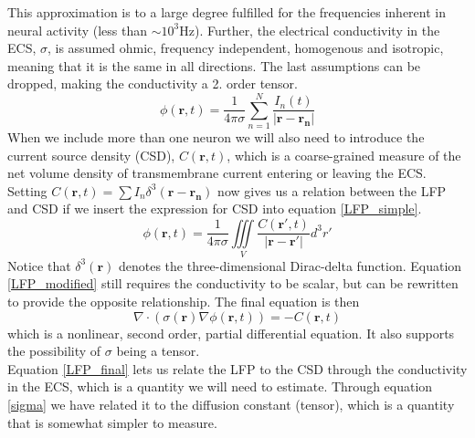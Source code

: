 \documentclass[a4paper,english, 12pt, twoside]{article}
\begin{document}
This approximation is to a large degree fulfilled for the frequencies inherent in neural activity (less than $\sim 10^3$Hz). 
Further, the electrical conductivity in the ECS, $\sigma$, is assumed ohmic, frequency independent, homogenous and isotropic, meaning that it is the same in all directions. 
The last assumptions can be dropped, making the conductivity a 2. order tensor.
\begin{equation}\label{LFP_simple}
 \phi(\mathbf{r},t) = \frac{1}{4\pi\sigma}\sum\limits_{n=1}^N\frac{I_n(t)}{|\mathbf{r}-\mathbf{r_n}|}
\end{equation}
When we include more than one neuron we will also need to introduce the current source density (CSD), $C(\mathbf{r},t)$, which is a coarse-grained measure of the net volume density of transmembrane current entering or leaving the ECS. 
Setting $C(\mathbf{r},t) = \sum I_n\delta^3(\mathbf{r}-\mathbf{r_n})$ now gives us a relation between the LFP and CSD if we insert the expression for CSD into equation \ref{LFP_simple}.
\begin{equation}\label{LFP_modified}
  \phi(\mathbf{r},t) = \frac{1}{4\pi\sigma}\iiint\limits_{V}\frac{C(\mathbf{r'},t)}{|\mathbf{r}-\mathbf{r'}|}d^3r'
\end{equation}
Notice that $\delta^3(\mathbf{r})$ denotes the three-dimensional Dirac-delta function. 
Equation \ref{LFP_modified} still requires the conductivity to be scalar, but can be rewritten to provide the opposite relationship. 
The final equation is then 
\begin{equation}\label{LFP_final}
 \nabla\cdot(\sigma(\mathbf{r})\nabla\phi(\mathbf{r},t)) = -C(\mathbf{r},t)
\end{equation}
which is a nonlinear, second order, partial differential equation. It also supports the possibility of $\sigma$ being a tensor.\\
Equation \ref{LFP_final} lets us relate the LFP to the CSD through the conductivity in the ECS, which is a quantity we will need to estimate. 
Through equation \ref{sigma} we have related it to the diffusion constant (tensor), which is a quantity that is somewhat simpler to measure.
\end{document}
